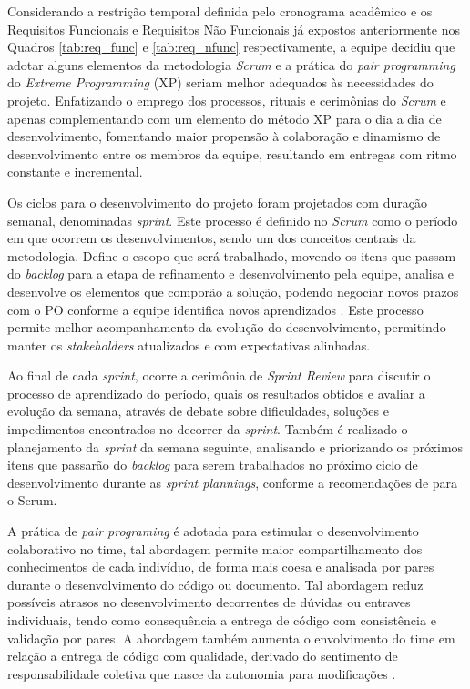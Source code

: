 \documentclass[
    12pt,               %
    openright,          %
    oneside,
    a4paper,            %
    BIBLATEX,           %
    TODO,               %
    english,            %
    brazil              %
    ]{ifsp-spo-inf-ctds}
\begin{document}
        Considerando a restrição temporal definida pelo cronograma acadêmico e os Requisitos Funcionais e Requisitos Não Funcionais já expostos anteriormente nos Quadros \ref{tab:req_func} e \ref{tab:req_nfunc} respectivamente, a equipe decidiu que adotar alguns elementos da metodologia \emph{Scrum}  e a prática do \emph{pair programming} do \emph{Extreme Programming} (XP)  seriam melhor adequados às necessidades do projeto. Enfatizando o emprego dos processos, rituais e cerimônias do \emph{Scrum} e apenas complementando com um elemento do método XP para o dia a dia de desenvolvimento, fomentando maior propensão à colaboração e dinamismo de desenvolvimento entre os membros da equipe, resultando em entregas com ritmo constante e incremental.


        Os ciclos para o desenvolvimento do projeto foram projetados com duração semanal, denominadas \emph{sprint}. Este processo é definido no \emph{Scrum} como o período em que ocorrem os desenvolvimentos, sendo um dos conceitos centrais da metodologia. Define o escopo que será trabalhado, movendo os itens que passam do \emph{backlog} para a etapa de refinamento e desenvolvimento pela equipe, analisa e desenvolve os elementos que comporão a solução, podendo negociar novos prazos com o PO conforme a equipe identifica novos aprendizados . Este processo permite melhor acompanhamento da evolução do desenvolvimento, permitindo manter os \emph{stakeholders} atualizados e com expectativas alinhadas.

        Ao final de cada \emph{sprint}, ocorre a cerimônia de \emph{Sprint Review} para discutir o processo de aprendizado do período, quais os resultados obtidos e avaliar a evolução da semana, através de debate sobre dificuldades, soluções e impedimentos encontrados no decorrer da \emph{sprint}. Também é realizado o planejamento da \emph{sprint} da semana seguinte, analisando e priorizando os próximos itens que passarão do \emph{backlog} para serem trabalhados no próximo ciclo de desenvolvimento durante as \emph{sprint plannings}, conforme a recomendações de  para o Scrum.

        A prática de \emph{pair programing} é adotada para estimular o desenvolvimento colaborativo no time, tal abordagem permite maior compartilhamento dos conhecimentos de cada indivíduo, de forma mais coesa e analisada por pares durante o desenvolvimento do código ou documento. Tal abordagem reduz possíveis atrasos no desenvolvimento decorrentes de dúvidas ou entraves individuais, tendo como consequência a entrega de código com consistência e validação por pares. A abordagem também aumenta o envolvimento do time em relação a entrega de código com qualidade, derivado do sentimento de responsabilidade coletiva que nasce da autonomia para modificações .
\end{document}
